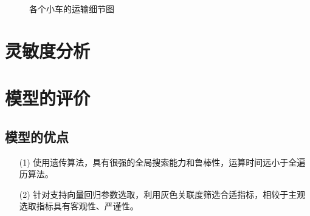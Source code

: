 \documentclass{whutmod}
\begin{document}
\begin{figure}[H]	
	\centering
	\caption{各个小车的运输细节图}
	\label{fisg}
\end{figure}

  
  \section{灵敏度分析}
  
  
  
  \section{模型的评价}
  \subsection{模型的优点}
  \begin{itemize}                                             
  	\item [(1)] 使用遗传算法，具有很强的全局搜索能力和鲁棒性，运算时间远小于全遍历算法。
  	
  	\item [(2)] 针对支持向量回归参数选取，利用灰色关联度筛选合适指标，相较于主观选取指标具有客观性、严谨性。	
  \end{itemize}
\end{document}
